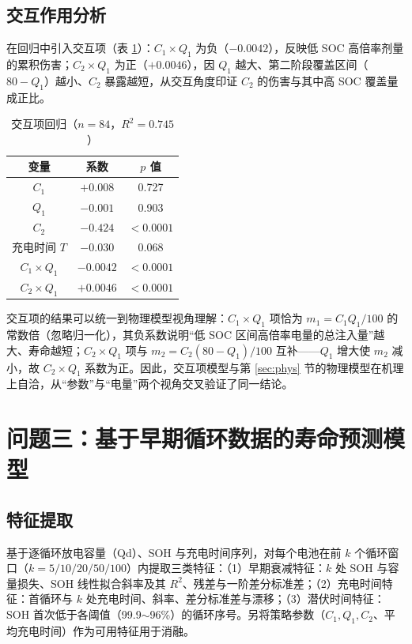 \documentclass[withoutpreface]{cumcmthesis}
\begin{document}
\subsection{交互作用分析}\label{sec:interact}

在回归中引入交互项（表 \ref{tab:interact}）：$C_1\times Q_1$ 为负（$-0.0042$），反映低 SOC 高倍率剂量的累积伤害；$C_2\times Q_1$ 为正（$+0.0046$），因 $Q_1$ 越大、第二阶段覆盖区间（$80-Q_1$）越小、$C_2$ 暴露越短，从交互角度印证 $C_2$ 的伤害与其中高 SOC 覆盖量成正比。

\begin{table}[htbp]
\centering
\caption{交互项回归（$n=84$，$R^2=0.745$）}
\label{tab:interact}
\begin{tabular}{ccc}
\toprule
变量 & 系数 & $p$ 值 \\
\midrule
$C_1$ & $+0.008$ & 0.727 \\
$Q_1$ & $-0.001$ & 0.903 \\
$C_2$ & $-0.424$ & $<0.0001$ \\
充电时间 $T$ & $-0.030$ & 0.068 \\
$C_1\times Q_1$ & $-0.0042$ & $<0.0001$ \\
$C_2\times Q_1$ & $+0.0046$ & $<0.0001$ \\
\bottomrule
\end{tabular}
\end{table}

交互项的结果可以统一到物理模型视角理解：$C_1\times Q_1$ 项恰为 $m_1=C_1Q_1/100$ 的常数倍（忽略归一化），其负系数说明“低 SOC 区间高倍率电量的总注入量”越大、寿命越短；$C_2\times Q_1$ 项与 $m_2=C_2(80-Q_1)/100$ 互补——$Q_1$ 增大使 $m_2$ 减小，故 $C_2\times Q_1$ 系数为正。因此，交互项模型与第 \ref{sec:phys} 节的物理模型在机理上自洽，从“参数”与“电量”两个视角交叉验证了同一结论。

\section{问题三：基于早期循环数据的寿命预测模型}

\subsection{特征提取}

基于逐循环放电容量（Qd）、SOH 与充电时间序列，对每个电池在前 $k$ 个循环窗口（$k=5/10/20/50/100$）内提取三类特征：（1）早期衰减特征：$k$ 处 SOH 与容量损失、SOH 线性拟合斜率及其 $R^2$、残差与一阶差分标准差；（2）充电时间特征：首循环与 $k$ 处充电时间、斜率、差分标准差与漂移；（3）潜伏时间特征：SOH 首次低于各阈值（99.9$\sim$96\%）的循环序号。另将策略参数（$C_1,Q_1,C_2$、平均充电时间）作为可用特征用于消融。
\end{document}
